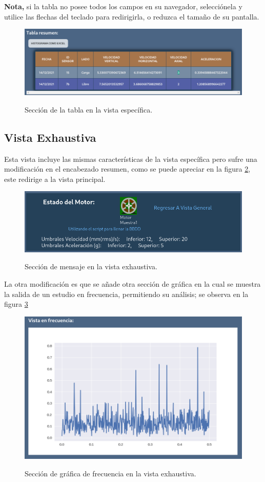 \documentclass[12pt]{article}
\begin{document}
\textbf{Nota,} si la tabla no posee todos los campos en su navegador, selecciónela
y utilice las flechas del teclado para redirigirla, o reduzca el tamaño de su
pantalla.

    \begin{figure}[H]
		\centering
        \caption{Sección de la tabla en la vista específica. }
        \includegraphics[width=\linewidth]{ManualUsuario/especificaTabla.png}
        \label{img:especificaTablaManual}
	\end{figure}


\subsection{Vista Exhaustiva}
Esta vista incluye las mismas características de la vista específica pero sufre
una modificación en el encabezado resumen, como se puede apreciar en la figura
\ref{img:exhaustivaMensajeManual},
este redirige a la vista principal.

    \begin{figure}[H]
		\centering
        \caption{Sección de mensaje en la vista exhaustiva. }
        \includegraphics[width=\linewidth]{ManualUsuario/exhaustivaMensaje.png}
        \label{img:exhaustivaMensajeManual}
	\end{figure}



La otra modificación es que se añade otra sección de gráfica en la cual se muestra
la salida de un estudio en frecuencia, permitiendo su análisis; se observa en
la figura \ref{img:exhaustivaGraficaFourierManual}


    \begin{figure}[H]
		\centering
        \caption{Sección de gráfica de frecuencia en la vista exhaustiva. }
        \includegraphics[width=\linewidth]{ManualUsuario/exhaustivaGraficaFourier.png}
        \label{img:exhaustivaGraficaFourierManual}
	\end{figure}
\end{document}
